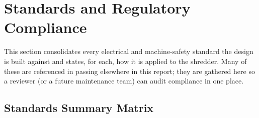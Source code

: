 \documentclass[hidelinks,12pt]{article}
\begin{document}
\section{Standards and Regulatory Compliance}

This section consolidates every electrical and machine-safety standard the design
is built against and states, for each, how it is applied to the shredder. Many of
these are referenced in passing elsewhere in this report; they are gathered here so
a reviewer (or a future maintenance team) can audit compliance in one place.

\subsection{Standards Summary Matrix}
\end{document}
